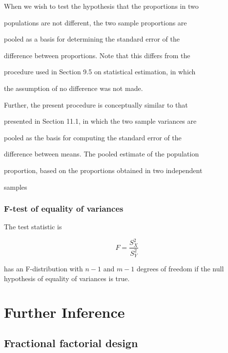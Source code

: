 When we wish to test the hypothesis that the proportions in two

populations are not different, the two sample proportions are

pooled as a basis for determining the standard error of the

difference between proportions. Note that this differs from the

procedure used in Section 9.5 on statistical estimation, in which

the assumption of no difference was not made.

 

Further, the present procedure is conceptually similar to that

presented in Section 11.1, in which the two sample variances are

pooled as the basis for computing the standard error of the

difference between means. The pooled estimate of the population

proportion, based on the proportions obtained in two independent

samples

 



\subsection{F-test of equality of variances}

The test statistic is

 

\begin{equation} F = \frac{S_X^2}{S_Y^2}\end{equation}

 

has an F-distribution with $n-1$ and $m-1$ degrees of freedom if the null hypothesis of equality of variances is true.

 



\chapter{Further Inference}

 

\section{Fractional factorial design}


